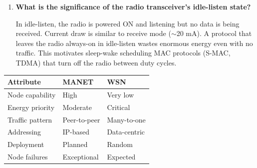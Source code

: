 \documentclass[12pt,a4paper]{article}
\newcommand{\Q}[1]{\textbf{#1}\par\noindent\ignorespaces}
\renewcommand{\arraystretch}{1.45}
\begin{document}
\begin{tcolorbox}[exambox, title={\textbf{Frequently Asked / Viva Questions}}]
\begin{enumerate}[topsep=0pt, label=\textbf{Q\arabic*.}, itemsep=5pt]
  \item \Q{What is the significance of the radio transceiver's idle-listen state?}
  In idle-listen, the radio is powered ON and listening but no data is being received. Current draw is similar to receive mode ($\sim$20 mA). A protocol that leaves the radio always-on in idle-listen wastes enormous energy even with no traffic. This motivates sleep-wake scheduling MAC protocols (S-MAC, TDMA) that turn off the radio between duty cycles.
\end{enumerate}
\end{tcolorbox}

\begin{tcolorbox}[tikzbox, title={\textbf{Summary: MANET vs WSN at a Glance}}]
\par\noindent
{\renewcommand{\arraystretch}{1.4}%
\begin{tabularx}{\linewidth}{|B{2.8cm}|Y|Y|}
\hline
\textbf{Attribute} & \textbf{MANET} & \textbf{WSN} \\
\hline
Node capability & High & Very low \\
\hline
Energy priority & Moderate & Critical \\
\hline
Traffic pattern & Peer-to-peer & Many-to-one \\
\hline
Addressing & IP-based & Data-centric \\
\hline
Deployment & Planned & Random \\
\hline
Node failures & Exceptional & Expected \\
\hline
\end{tabularx}}
\end{tcolorbox}
\end{document}
